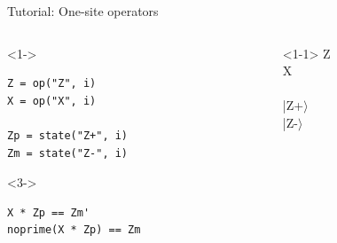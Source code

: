 \begin{frame}[fragile]{Tutorial: One-site operators}

\begin{columns}

\begin{column}{4.5cm}

\begin{onlyenv}<1->
\begin{lstlisting}[language=JuliaLocal, style=julia, basicstyle=\scriptsize\ttfamily]
Z = op("Z", i)
X = op("X", i)

Zp = state("Z+", i)
Zm = state("Z-", i)
\end{lstlisting}
\end{onlyenv}

\begin{onlyenv}<3->
\begin{lstlisting}[language=JuliaLocal, style=julia, basicstyle=\scriptsize\ttfamily]
X * Zp == Zm'
noprime(X * Zp) == Zm
\end{lstlisting}
\end{onlyenv}

\end{column}

\begin{column}{4.5cm}

\begin{onlyenv}<1-1>
Z \\
X \\
~\\
|Z+$\rangle$ \\
|Z-$\rangle$ \\
\end{onlyenv}


\end{column}
\end{columns}
\end{frame}
